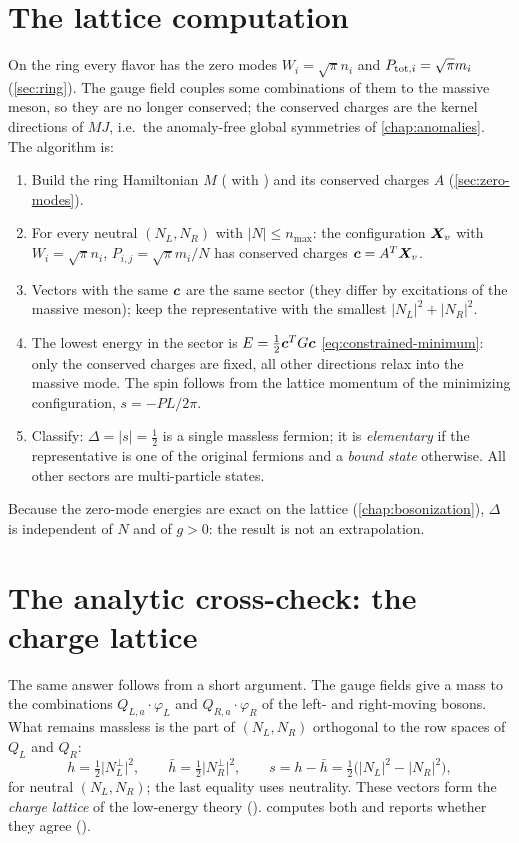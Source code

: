 \section{The lattice computation}
On the ring every flavor has the zero modes $W_i = \sqrt\pi n_i$ and $P_{{\rm tot},i} = \sqrt\pi m_i$
(\cref{sec:ring}). The gauge field couples some combinations of them to the massive meson, so they are no longer
conserved; the conserved charges are the kernel directions of $MJ$, i.e.\ the anomaly-free global symmetries of
\cref{chap:anomalies}. The algorithm is:
\begin{enumerate}
  \item Build the ring Hamiltonian $M$ ( with ) and its conserved
    charges $A$ (\cref{sec:zero-modes}).
  \item For every neutral $(N_L,N_R)$ with $|N|\leq n_{\max}$: the configuration $\bm{X}_v$ with
    $W_i = \sqrt\pi n_i$, $P_{i,j} = \sqrt\pi m_i/N$ has conserved charges $\bm{c} = A^T\bm{X}_v$.
  \item Vectors with the same $\bm{c}$ are the same sector (they differ by excitations of the massive meson); keep
    the representative with the smallest $|N_L|^2 + |N_R|^2$.
  \item The lowest energy in the sector is $E = \frac12\bm{c}^TG\bm{c}$ \eqref{eq:constrained-minimum}: only
    the conserved charges are fixed, all other directions relax into the massive mode. The spin follows from the
    lattice momentum of the minimizing configuration, $s = -PL/2\pi$.
  \item Classify: $\Delta = |s| = \frac12$ is a single massless fermion; it is \emph{elementary} if the
    representative is one of the original fermions and a \emph{bound state} otherwise. All other sectors are
    multi-particle states.
\end{enumerate}
Because the zero-mode energies are exact on the lattice (\cref{chap:bosonization}), $\Delta$ is independent of $N$
and of $g>0$: the result is not an extrapolation.

\section{The analytic cross-check: the charge lattice}
The same answer follows from a short argument. The gauge fields give a mass to the combinations
$Q_{L,a}\cdot\varphi_L$ and $Q_{R,a}\cdot\varphi_R$ of the left- and right-moving bosons. What remains massless is
the part of $(N_L, N_R)$ orthogonal to the row spaces of $Q_L$ and $Q_R$:
\begin{equation}\label{eq:charge-lattice}
  h = \tfrac12\bigl|N_L^\perp\bigr|^2,\qquad \bar h = \tfrac12\bigl|N_R^\perp\bigr|^2,\qquad
  s = h - \bar h = \tfrac12\bigl(|N_L|^2 - |N_R|^2\bigr),
\end{equation}
for neutral $(N_L,N_R)$; the last equality uses neutrality. These vectors form the \emph{charge lattice} of the
low-energy theory ().  computes both and reports whether
they agree ().

